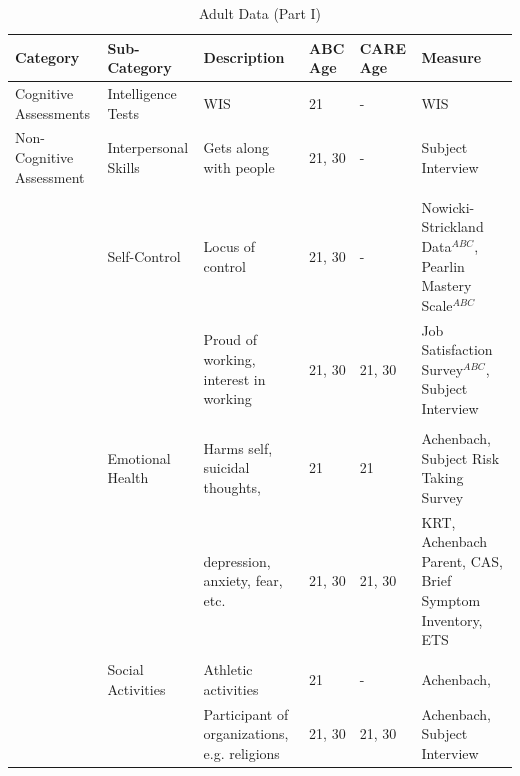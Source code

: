 \documentclass[static]{JJH-Beamer}
\begin{document}
\begin{frame}
 \addtocounter{framenumber}{-1}

\begin{table}[H]
\caption{Adult Data (Part I)} \label{tab:adultvars_1}							
\begin{center}
\begin{tiny}					
\begin{tabular}{L{1.2cm} C{1.4cm} C{2.5cm} C{.8cm} C{.8cm} C{2.9cm}}										
\toprule
\textbf{Category}	&	\textbf{Sub-Category}	&	\textbf{Description}	&	\textbf{ABC Age}  	&  \textbf{CARE Age}  & 	\textbf{Measure}	\\ \midrule
Cognitive Assessments   	&	       Intelligence Tests      	&	       WIS     	&	21	&	-	&	       WIS     \\
\midrule										
Non-Cognitive Assessment        	&	       Interpersonal Skills    	&	       Gets along with people  	&	       21, 30  	&	-	&	       Subject Interview   \\
\\										
        	&	       Self-Control    	&	       Locus of control        	&	       21, 30  	&	-	&	       Nowicki-Strickland Data$^{ABC}$, Pearlin Mastery Scale$^{ABC}$  \\
        	&	               	&	       Proud of working, interest in working   	&	       21, 30  	&	21, 30	&	       Job Satisfaction Survey$^{ABC}$, Subject Interview       \\
\\										
        	&	       Emotional Health        	&	       Harms self, suicidal thoughts,	&	21	&	21	&	       Achenbach,  Subject Risk Taking Survey   \\
        	&	               	&	       depression, anxiety, fear, etc. 	&	       21, 30  	&	21, 30	&	       KRT, Achenbach Parent,  CAS, Brief Symptom Inventory, ETS\\
\\										
        	&	       Social Activities       	&	       Athletic activities     	&	21	&	-	&	       Achenbach,  \\
        	&	               	&	       Participant of organizations, e.g. religions    	&	       21, 30  	&	21, 30	&	       Achenbach, Subject Interview        \\
\bottomrule							
\end{tabular}										
\end{tiny}
\end{center}							
\end{table}

\end{frame}
\end{document}
